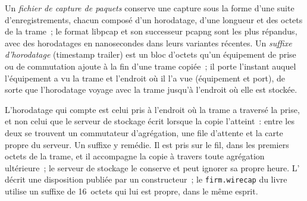 \begin{definition}\label{def:nw:capturing-and-monitoring-the-network:trailer}
Un \emph{fichier de capture de paquets} conserve une capture sous la forme d'une suite d'enregistrements, chacun composé
d'un horodatage, d'une longueur et des octets de la trame~; le format libpcap et son successeur pcapng sont les plus répandus, avec des horodatages en nanosecondes dans leurs variantes récentes.
Un \emph{suffixe d'horodatage} (timestamp trailer) est un bloc d'octets qu'un équipement de prise ou de commutation ajoute à la fin d'une trame copiée~;
il porte l'instant auquel l'équipement a vu la trame et l'endroit où il l'a vue (équipement et port), de sorte que l'horodatage
voyage avec la trame jusqu'à l'endroit où elle est stockée.
\end{definition}

L'horodatage qui compte est celui pris à l'endroit où la trame a traversé la prise, et non celui que le serveur de stockage écrit lorsque la
copie l'atteint~: entre les deux se trouvent un commutateur d'agrégation, une file d'attente et la carte propre du serveur. Un suffixe y remédie. Il est pris sur le
fil, dans les premiers octets de la trame, et il accompagne la copie à travers toute agrégation ultérieure~; le serveur de stockage le conserve et peut ignorer
sa propre heure. L' décrit une disposition publiée par un constructeur~; le
\texttt{firm.wirecap} du livre utilise un suffixe de 16~octets qui lui est propre, dans le même esprit.

